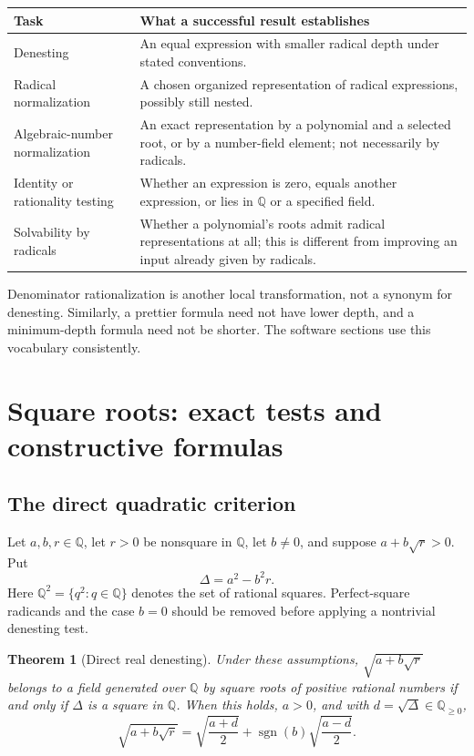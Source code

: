\documentclass[11pt,a4paper]{article}
\newcommand{\Q}{\mathbb{Q}}
\newcommand{\sgn}{\operatorname{sgn}}
\newtheorem{theorem}{Theorem}[section]
\theoremstyle{definition}
\theoremstyle{remark}
\numberwithin{equation}{section}
\begin{document}
\begin{longtable}{P{0.24\textwidth}P{0.70\textwidth}}
\toprule
Task & What a successful result establishes \\
\midrule
\endhead
Denesting & An equal expression with smaller radical depth under stated conventions.\\
Radical normalization & A chosen organized representation of radical expressions, possibly still nested.\\
Algebraic-number normalization & An exact representation by a polynomial and a selected root, or by a number-field element; not necessarily by radicals.\\
Identity or rationality testing & Whether an expression is zero, equals another expression, or lies in $\Q$ or a specified field.\\
Solvability by radicals & Whether a polynomial's roots admit radical representations at all; this is different from improving an input already given by radicals.\\
\bottomrule
\end{longtable}

Denominator rationalization is another local transformation, not a synonym for denesting. Similarly, a prettier formula need not have lower depth, and a minimum-depth formula need not be shorter. The software sections use this vocabulary consistently.\cite{cavinessfateman,zippel,landaumiller,jeffreyrich}

\section{Square roots: exact tests and constructive formulas}
\label{sec:squares}

\subsection{The direct quadratic criterion}

Let $a,b,r\in\Q$, let $r>0$ be nonsquare in $\Q$, let $b\ne0$, and suppose $a+b\sqrt r>0$. Put
\begin{equation}\label{eq:delta}
 \Delta=a^2-b^2r.
\end{equation}
Here $\Q^2=\{q^2:q\in\Q\}$ denotes the set of rational squares. Perfect-square radicands and the case $b=0$ should be removed before applying a nontrivial denesting test.

\begin{theorem}[Direct real denesting]\label{thm:direct}
Under these assumptions, $\sqrt{a+b\sqrt r}$ belongs to a field generated over $\Q$ by square roots of positive rational numbers if and only if $\Delta$ is a square in $\Q$. When this holds, $a>0$, and with $d=\sqrt\Delta\in\Q_{\ge0}$,
\begin{equation}\label{eq:direct}
 \sqrt{a+b\sqrt r}
 =\sqrt{\frac{a+d}{2}}+
   \sgn(b)\sqrt{\frac{a-d}{2}}.
\end{equation}
\end{theorem}
\end{document}

